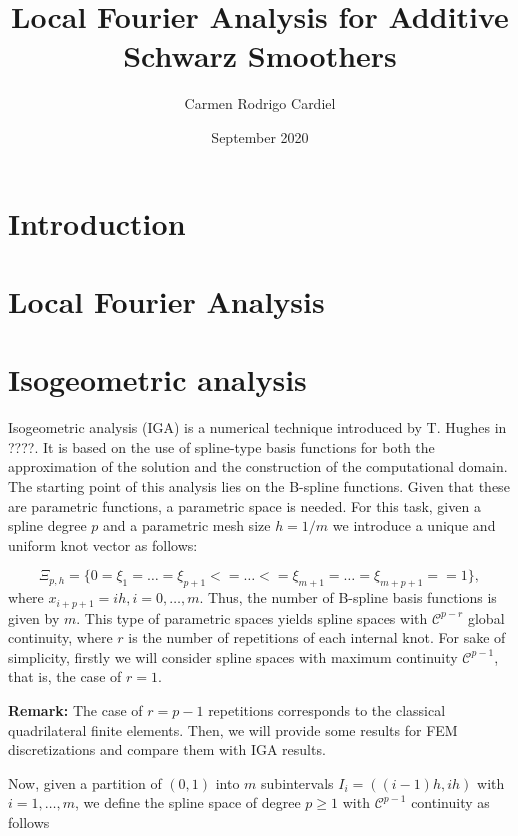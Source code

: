 \documentclass{article}
\title{Local Fourier Analysis for Additive Schwarz Smoothers }
\author{Carmen Rodrigo Cardiel}
\date{September 2020}
\begin{document}
\maketitle

\section{Introduction}

\section{Local Fourier Analysis}

\section{Isogeometric analysis}

Isogeometric analysis (IGA) is a numerical technique introduced by T. Hughes in ????. It is based on the use of spline-type basis functions for both the approximation of the solution and the construction of the computational domain. The starting point of this analysis lies on the B-spline functions. Given that these are parametric functions, a parametric space is needed. For this task, given a spline degree $p$ and a parametric mesh size $h=1/m$ we introduce a unique and uniform knot vector as follows:


\begin{equation}
    \Xi_{p,h} = \lbrace 0 = \xi_1 = \ldots = \xi_{p+1} <=  \ldots <= \xi_{m+1} = \ldots = \xi_{m+p+1} == 1  \rbrace,
\end{equation}
where $x_{i+p+1} =ih, i=0,\ldots,m$. Thus, the number of B-spline basis functions is given by $m$. This type of parametric spaces yields spline spaces with $\mathcal{C}^{p-r}$ global continuity, where $r$ is the number of repetitions of each internal knot. For sake of simplicity, firstly we will consider spline spaces with maximum continuity $\mathcal{C}^{p-1}$, that is, the case of $r=1$.

\textbf{Remark: } The case of $r=p-1$ repetitions corresponds to the classical quadrilateral finite elements. Then, we will provide some results for FEM discretizations and compare them with IGA results.

Now, given a partition of $(0,1)$ into $m$ subintervals $I_i=\left((i-1)h,ih\right)$ with $i=1,\ldots,m$, we define the spline space of degree $p \geq 1$ with $\mathcal{C}^{p-1}$ continuity as follows
\end{document}
